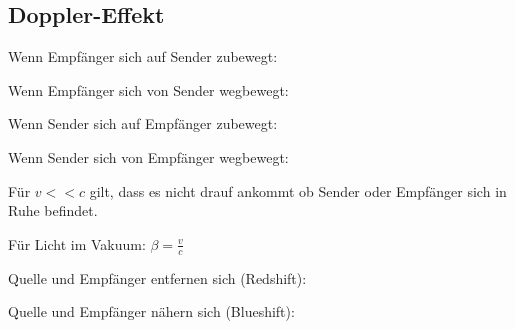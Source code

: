 \subsection{Doppler-Effekt}    
    Wenn Empfänger sich auf Sender zubewegt:

    Wenn Empfänger sich von Sender wegbewegt:

    Wenn Sender sich auf Empfänger zubewegt:

    Wenn Sender sich von Empfänger wegbewegt:

    Für $v << c$ gilt, dass es nicht drauf ankommt ob Sender oder Empfänger sich in Ruhe befindet.

    Für Licht im Vakuum:
    $\beta = \frac{v}{c}$

    Quelle und Empfänger entfernen sich (Redshift):

    Quelle und Empfänger nähern sich (Blueshift):
